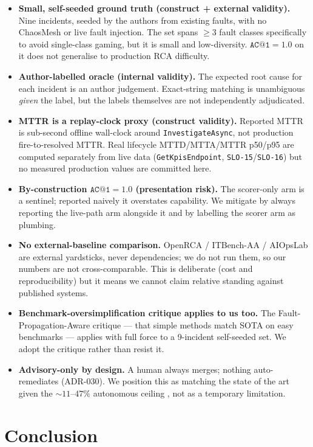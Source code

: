 \documentclass[11pt]{article}
\makeatletter
\newcommand{\acone}{\texttt{AC@1}}
\newcommand{\code}[1]{\texttt{#1}}
\makeatother
\begin{document}
\begin{itemize}
  \item \textbf{Small, self-seeded ground truth (construct + external validity).} Nine
  incidents, seeded by the authors from existing faults, with no ChaosMesh or live fault
  injection. The set spans $\ge 3$ fault classes specifically to avoid single-class gaming,
  but it is small and low-diversity. $\acone{} = 1.0$ on it does not generalise to
  production RCA difficulty.
  \item \textbf{Author-labelled oracle (internal validity).} The expected root cause for each
  incident is an author judgement. Exact-string matching is unambiguous \emph{given} the
  label, but the labels themselves are not independently adjudicated.
  \item \textbf{MTTR is a replay-clock proxy (construct validity).} Reported MTTR is
  sub-second offline wall-clock around \code{InvestigateAsync}, not production
  fire-to-resolved MTTR. Real lifecycle MTTD/MTTA/MTTR p50/p95 are computed separately from
  live data (\code{GetKpisEndpoint}, \code{SLO-15}/\code{SLO-16}) but no measured production
  values are committed here.
  \item \textbf{By-construction $\acone{} = 1.0$ (presentation risk).} The scorer-only arm is
  a sentinel; reported naively it overstates capability. We mitigate by always reporting the
  live-path arm alongside it and by labelling the scorer arm as plumbing.
  \item \textbf{No external-baseline comparison.} OpenRCA / ITBench-AA / AIOpsLab are
  external yardsticks, never dependencies; we do not run them, so our numbers are not
  cross-comparable. This is deliberate (cost and reproducibility) but it means we cannot
  claim relative standing against published systems.
  \item \textbf{Benchmark-oversimplification critique applies to us too.} The
  Fault-Propagation-Aware critique \citep{rethinking2025faultprop} --- that simple methods
  match SOTA on easy benchmarks --- applies with full force to a 9-incident self-seeded set.
  We adopt the critique rather than resist it.
  \item \textbf{Advisory-only by design.} A human always merges; nothing auto-remediates
  (ADR-030). We position this as matching the state of the art given the ${\sim}11$--$47\%$
  autonomous ceiling \citep{xu2025openrca,aa2026itbenchaa}, not as a temporary limitation.
\end{itemize}

\section{Conclusion}
\label{sec:conclusion}
\end{document}
